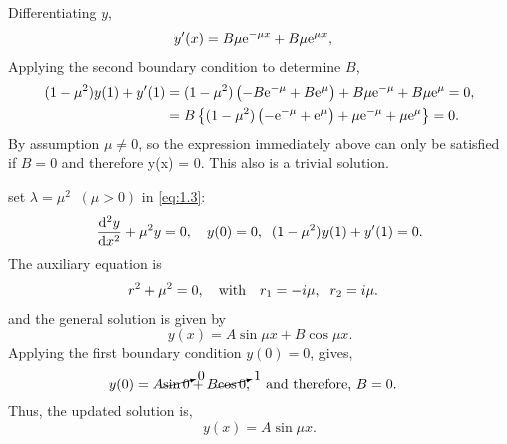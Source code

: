 \begin{description}[itemindent=-0.9cm]
\[\]
Differentiating $y$,
\begin{align*}
	y^\prime(x) &= B\mu\mathrm{e}^{-\mu x}+ B\mu\mathrm{e}^{\mu x},
\end{align*}
Applying the second boundary condition to determine $B$,
\begin{align*}
(1-\mu^2) y(1) + y^\prime(1) &= (1-\mu^2) \left(-B\mathrm{e}^{-\mu} + B\mathrm{e}^{\mu}\right) + B\mu\mathrm{e}^{-\mu}+ B\mu\mathrm{e}^{\mu} = 0,\\
                          &= B\left\{(1-\mu^2) \left(-\mathrm{e}^{-\mu} + \mathrm{e}^{\mu}\right) + \mu\mathrm{e}^{-\mu}+ \mu\mathrm{e}^{\mu}\right\} =0.
\end{align*}
By assumption $\mu \ne 0$, so the expression immediately above can only be satisfied if $B=0$  and therefore y(x) = 0.  This also is a trivial solution.
\begin{comment}
========================================================================================================================================================
\end{comment}
\item[If $\lambda > 0$]
set $λ = \mu^2\;\;(\mu > 0)$ in \eqref{eq:1.3}:
\begin{align*}
	\frac{\mathrm{d}^2y}{\mathrm{d}x^2} + \mu^2 y =0,\quad y(0) = 0,\;\;(1-\mu^2)y(1) + y^\prime(1)=0.
\end{align*}
The auxiliary equation is
\begin{align*}
	&r^2 + \mu^2 = 0, \quad\text{with}\quad r_1 = -i\mu,\;\; r_2 = i\mu.
\end{align*}
and the general solution is given by
\[
	y(x) = A \sin \mu x + B\cos \mu x.
\]
Applying the first boundary condition $y(0) = 0$, gives,
\[
	y(0) = A \cancelto{0}{\sin 0}  + B\cancelto{1}{\cos 0},\quad\text{and therefore, $B=0$.}\quad 
\]
Thus, the updated solution is, \[y(x) = A\sin \mu x.\]


\end{description}
